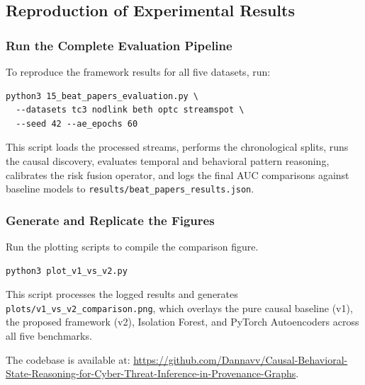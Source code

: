 \subsection{Reproduction of Experimental Results}

\subsubsection{Run the Complete Evaluation Pipeline}
To reproduce the framework results for all five datasets, run:
\begin{lstlisting}
python3 15_beat_papers_evaluation.py \
  --datasets tc3 nodlink beth optc streamspot \
  --seed 42 --ae_epochs 60
\end{lstlisting}
This script loads the processed streams, performs the chronological splits, runs the causal discovery, evaluates temporal and behavioral pattern reasoning, calibrates the risk fusion operator, and logs the final AUC comparisons against baseline models to \texttt{results/beat\_papers\_results.json}.

\subsubsection{Generate and Replicate the Figures}
Run the plotting scripts to compile the comparison figure.
\begin{lstlisting}
python3 plot_v1_vs_v2.py
\end{lstlisting}
This script processes the logged results and generates \texttt{plots/v1\_vs\_v2\_comparison.png}, which overlays the pure causal baseline (v1), the proposed framework (v2), Isolation Forest, and PyTorch Autoencoders across all five benchmarks.

The codebase is available at: \url{https://github.com/Dannavv/Causal-Behavioral-State-Reasoning-for-Cyber-Threat-Inference-in-Provenance-Graphs}.

